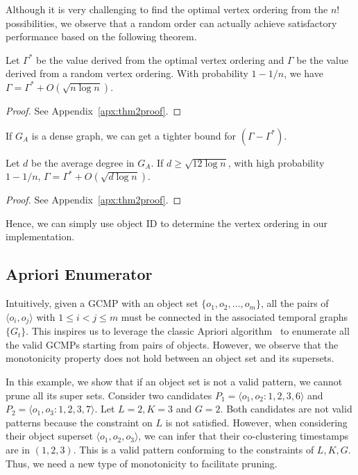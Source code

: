 Although it is very challenging to find the optimal vertex ordering from the $n!$ possibilities, we observe that a random order can actually achieve satisfactory performance based on the following theorem.


\begin{theorem}
\label{THM:SPM_LB}
Let $\Gamma^*$ be the value derived from the optimal vertex ordering and  $\Gamma$ be the value derived from a random vertex ordering. With probability $1-1/n$, we have $\Gamma = \Gamma^* + O(\sqrt{n \log n})$.
\end{theorem}
\begin{proof}
See Appendix~\ref{apx:thm2proof}.
\end{proof}
If $G_A$ is a dense graph, we can get a tighter bound for $(\Gamma - \Gamma^*)$.
\begin{theorem}
\label{THM:SPM_LB_INC}
Let $d$ be the average degree in $G_A$. If $d\geq \sqrt{12\log n}$, with
high probability $1-1/n$, $\Gamma = \Gamma^* + O(\sqrt{d\log n})$.
\end{theorem}
\begin{proof}
See Appendix~\ref{apx:thm2proof}.
\end{proof}
Hence, we can simply use object ID to determine the vertex ordering in our implementation.


\subsection{Apriori Enumerator}
Intuitively, given a GCMP with an object set $\{o_1,o_2,\ldots,o_m\}$, 
all the pairs of $\langle o_i,o_j \rangle$ with $1\leq i<j\leq m$ must 
be connected in the associated temporal graphs $\{G_t\}$. This inspires us to leverage the classic Apriori algorithm~\cite{agrawal1994fast} to enumerate all the valid GCMPs starting from pairs of objects. However, we observe that the monotonicity property does not hold between an object set and its supersets.

\begin{example}
In this example, we show that if an object set is not a valid pattern, we cannot prune all its super sets.
Consider two candidates $P_1=\langle o_1,o_2:1,2,3,6 \rangle$ and $P_2=\langle o_1,o_3:1,2,3,7 \rangle$. 
Let $L=2,K=3$ and $G=2$. Both candidates are not valid patterns because the constraint on $L$ is not satisfied. 
However, when considering their object superset $\langle o_1,o_2,o_3 \rangle$, we can infer that their co-clustering timestamps are in $(1,2,3)$. This is a valid pattern conforming to the constraints of $L,K,G$. Thus, we need a new type of monotonicity to facilitate pruning.
\end{example}   


